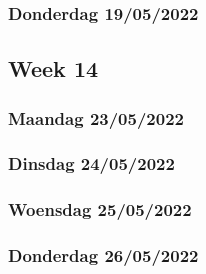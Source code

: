 \subsubsection{Donderdag 19/05/2022}

\subsection{Week 14}

\subsubsection{Maandag 23/05/2022}

\subsubsection{Dinsdag 24/05/2022}

\subsubsection{Woensdag 25/05/2022}

\subsubsection{Donderdag 26/05/2022}